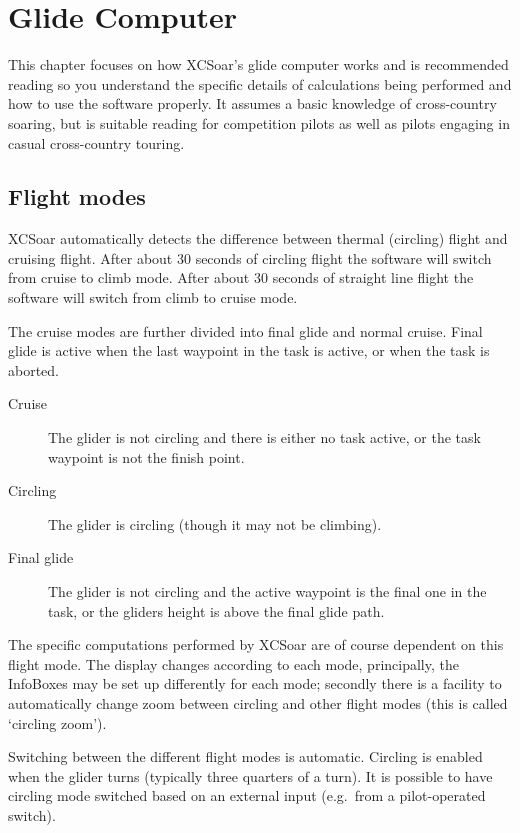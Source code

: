 \documentclass[a4paper,12pt]{refrep}
\begin{document}
\chapter{Glide Computer}\label{cha:glide}
This chapter focuses on how XCSoar's glide computer works and is
recommended reading so you understand the specific details of
calculations being performed and how to use the software properly.  It
assumes a basic knowledge of cross-country soaring, but is suitable
reading for competition pilots as well as pilots engaging in casual
cross-country touring.

\section{Flight modes} 

XCSoar automatically detects the difference between thermal (circling)
flight and cruising flight. After about 30 seconds of circling flight
the software will switch from cruise to climb mode. After about 30
seconds of straight line flight the software will switch from climb to
cruise mode.

The cruise modes are further divided into final glide and normal
cruise.  Final glide is active when the last waypoint in the task is
active, or when the task is aborted.

\begin{description}
\item[Cruise]   The glider is not circling and there is either no task
  active, or the task waypoint is not the finish point.
\item[Circling]  The glider is circling (though it may not be climbing).
\item[Final glide]  The glider is not circling and the active waypoint is the
 final one in the task, or the gliders height is above the final glide path.
\end{description}

The specific computations performed by XCSoar are of course dependent
on this flight mode.  The display changes according to each mode, principally,
the InfoBoxes may be set up differently for each mode; secondly there
is a facility to automatically change zoom between circling and other
flight modes (this is called `circling zoom').

Switching between the different flight modes is automatic.  Circling
is enabled when the glider turns (typically three quarters of a turn).
It is possible to have circling mode switched based on an external
input (e.g.\ from a pilot-operated switch).
\end{document}
